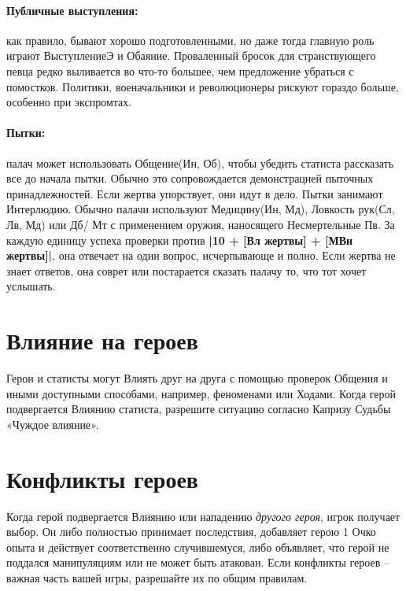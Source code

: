 \paragraph{Публичные выступления:} как правило, бывают хорошо подготовленными, но даже тогда главную роль играют ВыступлениеЭ и Обаяние. Проваленный бросок для странствующего певца редко выливается во что-то большее, чем предложение убраться с помостков. Политики, военачальники и революционеры рискуют гораздо больше, особенно при экспромтах.
\paragraph{Пытки:} палач может использовать Общение(Ин, Об),  чтобы убедить статиста рассказать все до начала пытки. Обычно это сопровождается демонстрацией пыточных принадлежностей. Если жертва упорствует, они идут в дело. Пытки занимают Интерлюдию. Обычно палачи используют Медицину(Ин, Мд), Ловкость рук(Сл, Лв, Мд) или Дб/ Мт с применением оружия, наносящего Несмертельные Пв. 
\newline За каждую единицу успеха проверки против \textbf{|10 + [Вл жертвы] + [МВн жертвы]|}, она отвечает на один вопрос, исчерпывающе и полно. Если жертва не знает ответов, она соврет или постарается сказать палачу то, что тот хочет услышать.

\section{Влияние на героев}
Герои и статисты могут Влиять друг на друга с помощью проверок Общения и иными доступными способами, например, феноменами или Ходами. 
\newline Когда герой подвергается Влиянию статиста, разрешите ситуацию согласно Капризу Судьбы «Чуждое влияние».

\section{Конфликты героев}
Когда герой подвергается Влиянию или нападению \textit{другого героя}, игрок получает выбор. Он либо полностью принимает последствия, добавляет герою 1 Очко опыта и действует соответственно случившемуся, либо объявляет, что герой не поддался манипуляциям или не может быть атакован. 
\newline Если конфликты героев – важная часть вашей игры, разрешайте их по общим правилам.


